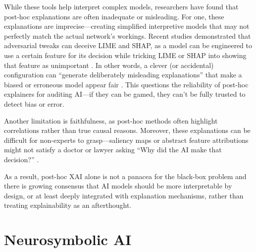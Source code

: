 While these tools help interpret complex models, researchers have found that post-hoc explanations are often inadequate or misleading. For one, these explanations are imprecise---creating simplified interpretive models that may not perfectly match the actual network’s workings. Recent studies demonstrated that adversarial tweaks can deceive LIME and SHAP, as a model can be engineered to use a certain feature for its decision while tricking LIME or SHAP into showing that feature as unimportant \cite{slack2020foolinglimeshapadversarial}. In other words, a clever (or accidental) configuration can ``generate deliberately misleading explanations'' that make a biased or erroneous model appear fair \cite{slack2020foolinglimeshapadversarial}. This questions the reliability of post-hoc explainers for auditing AI---if they can be gamed, they can't be fully trusted to detect bias or error.


Another limitation is faithfulness, as post-hoc methods often highlight correlations rather than true causal reasons. Moreover, these explanations can be difficult for non-experts to grasp---saliency maps or abstract feature attributions might not satisfy a doctor or lawyer asking ``Why did the AI make that decision?'' \cite{yeh2019infidelitysensitivityexplanations}. 

As a result, post-hoc XAI alone is not a panacea for the black-box problem and there is growing consensus that AI models should be more interpretable by design, or at least deeply integrated with explanation mechanisms, rather than treating explainability as an afterthought.


\section{Neurosymbolic AI}
\label{sec:sec_nsai}

